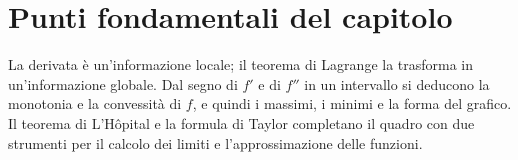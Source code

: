 \section{Punti fondamentali del capitolo}
\label{sec:sintesi-cap06}

La derivata è un'informazione locale; il teorema di Lagrange la trasforma in
un'informazione globale. Dal segno di $f'$ e di $f''$ in un intervallo si deducono la
monotonia e la convessità di $f$, e quindi i massimi, i minimi e la forma del grafico.
Il teorema di L'Hôpital e la formula di Taylor completano il quadro con due strumenti
per il calcolo dei limiti e l'approssimazione delle funzioni.


